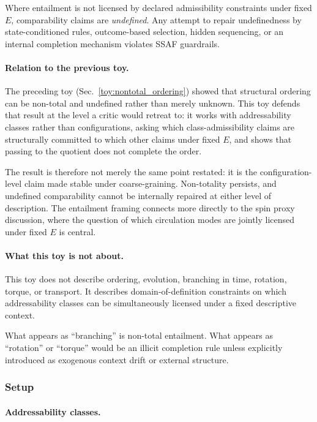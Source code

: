 \documentclass[aps,prx,onecolumn,11pt]{revtex4-2}
\theoremstyle{plain}
\theoremstyle{definition}
\theoremstyle{remark}
\begin{document}
Where entailment is not licensed by declared admissibility constraints
under fixed \(E\), comparability claims are \emph{undefined}. Any
attempt to repair undefinedness by state-conditioned rules,
outcome-based selection, hidden sequencing, or an internal completion
mechanism violates SSAF guardrails.

\paragraph{Relation to the previous toy.}

The preceding toy
(Sec.~\ref{toy:nontotal_ordering}) showed that structural ordering can
be non-total and undefined rather than merely unknown. This toy defends
that result at the level a critic would retreat to: it works with
addressability classes rather than configurations, asking which
class-admissibility claims are structurally committed to which other
claims under fixed \(E\), and shows that passing to the quotient does
not complete the order.

The result is therefore not merely the same point restated: it is the
configuration-level claim made stable under coarse-graining.
Non-totality persists, and undefined comparability cannot be internally
repaired at either level of description. The entailment
framing connects more directly to the spin proxy discussion, where the
question of which circulation modes are jointly licensed under fixed
\(E\) is central.

\paragraph{What this toy is not about.}

This toy does not describe ordering, evolution, branching in time,
rotation, torque, or transport. It describes domain-of-definition
constraints on which addressability classes can be simultaneously
licensed under a fixed descriptive context.

What appears as ``branching'' is non-total entailment. What appears as
``rotation'' or ``torque'' would be an illicit completion rule unless
explicitly introduced as exogenous context drift or external structure.

\subsubsection{Setup}
\label{toy:admissibility_entailment:setup}

\paragraph{Addressability classes.}
\end{document}

